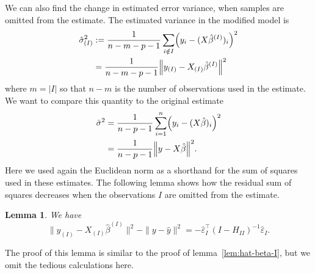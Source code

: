 \documentclass[
  a4paper,
]{article}
\newtheorem{lemma}{Lemma}[section]
\theoremstyle{definition}
\theoremstyle{definition}
\theoremstyle{definition}
\theoremstyle{definition}
\theoremstyle{remark}
\begin{document}
We can also find the change in estimated error variance, when samples
are omitted from the estimate. The estimated variance in the modified model
is
\begin{align*}
  \hat\sigma_{(I)}^2
  &:= \frac{1}{n-m-p-1} \sum_{i\notin I} \Bigl( y_i - (X\hat\beta^{(I)})_i \Bigr)^2 \\
  &= \frac{1}{n-m-p-1} \Bigl\| y_{(I)} - X_{(I)} \hat\beta^{(I)} \Bigr\|^2
\end{align*}
where \(m = |I|\) so that \(n-m\) is the number of observations used
in the estimate. We want to compare this quantity to the original estimate
\begin{align*}
  \hat\sigma^2
  &= \frac{1}{n-p-1} \sum_{i=1}^n \Bigl( y_i - (X\hat\beta)_i \Bigr)^2 \\
  &= \frac{1}{n-p-1} \Bigl\| y - X \hat\beta \Bigr\|^2.
\end{align*}
Here we used again the Euclidean norm as a shorthand for the sum of squares
used in these estimates. The following lemma shows how the residual sum
of squares decreases when the observations \(I\) are omitted from the
estimate.

\begin{lemma}
\protect\hypertarget{lem:sigma-I}{}\label{lem:sigma-I}We have
\begin{equation*}
  \| y_{(I)} - X_{(I)} \hat\beta^{(I)} \|^2 - \| y - \hat y \|^2
  = - \hat\varepsilon_I^\top (I - H_{II})^{-1} \hat\varepsilon_I.
\end{equation*}
\end{lemma}

The proof of this lemma is similar to the proof of lemma~\ref{lem:hat-beta-I},
but we omit the tedious calculations here.
\end{document}

